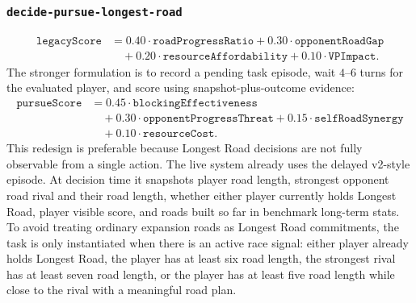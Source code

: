 \documentclass{article}
\begin{document}
\subsubsection{\texttt{decide-pursue-longest-road}}
\label{app:task-decide-pursue-longest-road}
\[
\begin{aligned}
\texttt{legacyScore}
&= 0.40 \cdot \texttt{roadProgressRatio}
+ 0.30 \cdot \texttt{opponentRoadGap} \\
&\quad + 0.20 \cdot \texttt{resourceAffordability}
+ 0.10 \cdot \texttt{VPImpact}.
\end{aligned}
\]
The stronger formulation is to record a pending task episode, wait $4$--$6$ turns for the evaluated player, and score using snapshot-plus-outcome evidence:
\[
\begin{aligned}
\texttt{pursueScore}
&= 0.45 \cdot \texttt{blockingEffectiveness} \\
&\quad + 0.30 \cdot \texttt{opponentProgressThreat}
+ 0.15 \cdot \texttt{selfRoadSynergy} \\
&\quad
+ 0.10 \cdot \texttt{resourceCost}.
\end{aligned}
\]
This redesign is preferable because Longest Road decisions are not fully observable from a single action.
The live system already uses the delayed v2-style episode. At decision time it snapshots player road length, strongest opponent road rival and their road length, whether either player currently holds Longest Road, player visible score, and roads built so far in benchmark long-term stats.
To avoid treating ordinary expansion roads as Longest Road commitments, the task is only instantiated when there is an active race signal: either player already holds Longest Road, the player has at least six road length, the strongest rival has at least seven road length, or the player has at least five road length while close to the rival with a meaningful road plan.
\end{document}
